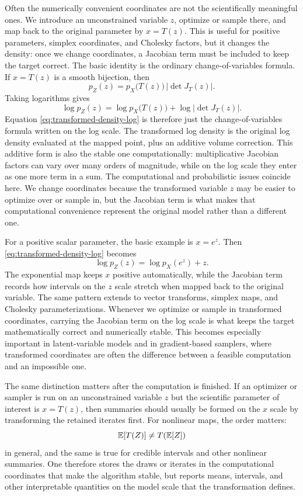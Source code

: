 Often the numerically convenient coordinates are not the scientifically meaningful ones.
We introduce an unconstrained variable \(z\), optimize or sample there, and map back to the original parameter by \(x=T(z)\).
This is useful for positive parameters, simplex coordinates, and Cholesky factors, but it changes the density: once we change coordinates, a Jacobian term must be included to keep the target correct.
The basic identity is the ordinary change-of-variables formula.
If $x=T(z)$ is a smooth bijection, then
\[
  p_Z(z) = p_X\!\bigl(T(z)\bigr)\,\lvert \det J_T(z)\rvert.
\]
Taking logarithms gives
\begin{equation}
  \log p_Z(z)
  =
  \log p_X\!\bigl(T(z)\bigr)
  +
  \log \lvert \det J_T(z)\rvert.
  \label{eq:transformed-density-log}
\end{equation}
Equation \eqref{eq:transformed-density-log} is therefore just the change-of-variables formula written on the log scale.
The transformed log density is the original log density evaluated at the mapped point, plus an additive volume correction.
This additive form is also the stable one computationally: multiplicative Jacobian factors can vary over many orders of magnitude, while on the log scale they enter as one more term in a sum.
The computational and probabilistic issues coincide here.
We change coordinates because the transformed variable $z$ may be easier to optimize over or sample in, but the Jacobian term is what makes that computational convenience represent the original model rather than a different one.

For a positive scalar parameter, the basic example is $x=e^z$.
Then \eqref{eq:transformed-density-log} becomes
\[
  \log p_Z(z) = \log p_X(e^z) + z.
\]
The exponential map keeps $x$ positive automatically, while the Jacobian term records how intervals on the $z$ scale stretch when mapped back to the original variable.
The same pattern extends to vector transforms, simplex maps, and Cholesky parameterizations.
Whenever we optimize or sample in transformed coordinates, carrying the Jacobian term on the log scale is what keeps the target mathematically correct and numerically stable.
This becomes especially important in latent-variable models and in gradient-based samplers, where transformed coordinates are often the difference between a feasible computation and an impossible one.

The same distinction matters after the computation is finished.
If an optimizer or sampler is run on an unconstrained variable $z$ but the scientific parameter of interest is $x=T(z)$, then summaries should usually be formed on the $x$ scale by transforming the retained iterates first.
For nonlinear maps, the order matters:
\[
  \mathbb{E}[T(Z)] \neq T(\mathbb{E}[Z])
\]
in general, and the same is true for credible intervals and other nonlinear summaries.
One therefore stores the draws or iterates in the computational coordinates that make the algorithm stable, but reports means, intervals, and other interpretable quantities on the model scale that the transformation defines.


